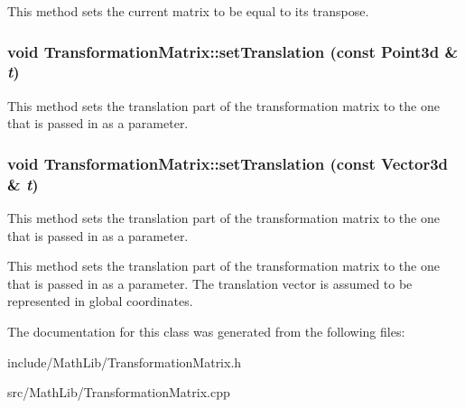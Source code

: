 \label{classCartWheel_1_1Math_1_1TransformationMatrix_a934946ab95fb6777ae21f5c26082d6bc}
This method sets the current matrix to be equal to its transpose. \hypertarget{classCartWheel_1_1Math_1_1TransformationMatrix_a82063df8524e1a1dfb9fbee82d73cc97}{
\subsubsection[{setTranslation}]{\setlength{\rightskip}{0pt plus 5cm}void TransformationMatrix::setTranslation (const {\bf Point3d} \& {\em t})}}
\label{classCartWheel_1_1Math_1_1TransformationMatrix_a82063df8524e1a1dfb9fbee82d73cc97}
This method sets the translation part of the transformation matrix to the one that is passed in as a parameter. \hypertarget{classCartWheel_1_1Math_1_1TransformationMatrix_a0abcd5611957fc28fdd5b0051dffde9e}{
\subsubsection[{setTranslation}]{\setlength{\rightskip}{0pt plus 5cm}void TransformationMatrix::setTranslation (const {\bf Vector3d} \& {\em t})}}
\label{classCartWheel_1_1Math_1_1TransformationMatrix_a0abcd5611957fc28fdd5b0051dffde9e}
This method sets the translation part of the transformation matrix to the one that is passed in as a parameter.

This method sets the translation part of the transformation matrix to the one that is passed in as a parameter. The translation vector is assumed to be represented in global coordinates. 

The documentation for this class was generated from the following files:\begin{DoxyCompactItemize}
\item 
include/MathLib/TransformationMatrix.h\item 
src/MathLib/TransformationMatrix.cpp\end{DoxyCompactItemize}
